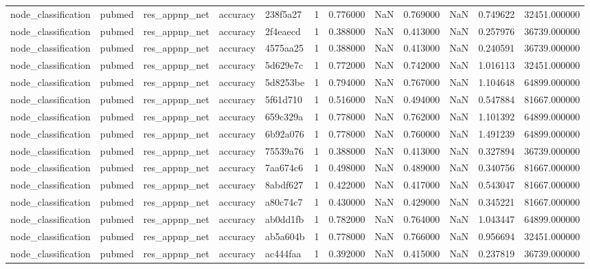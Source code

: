 \begin{tabular}{lllllrrrrrrr}
node_classification & pubmed & res_appnp_net & accuracy & 238f5a27 & 1 & 0.776000 & NaN & 0.769000 & NaN & 0.749622 & 32451.000000 \\
node_classification & pubmed & res_appnp_net & accuracy & 2f4eaecd & 1 & 0.388000 & NaN & 0.413000 & NaN & 0.257976 & 36739.000000 \\
node_classification & pubmed & res_appnp_net & accuracy & 4575aa25 & 1 & 0.388000 & NaN & 0.413000 & NaN & 0.240591 & 36739.000000 \\
node_classification & pubmed & res_appnp_net & accuracy & 5d629e7c & 1 & 0.772000 & NaN & 0.742000 & NaN & 1.016113 & 32451.000000 \\
node_classification & pubmed & res_appnp_net & accuracy & 5d8253be & 1 & 0.794000 & NaN & 0.767000 & NaN & 1.104648 & 64899.000000 \\
node_classification & pubmed & res_appnp_net & accuracy & 5f61d710 & 1 & 0.516000 & NaN & 0.494000 & NaN & 0.547884 & 81667.000000 \\
node_classification & pubmed & res_appnp_net & accuracy & 659c329a & 1 & 0.778000 & NaN & 0.762000 & NaN & 1.101392 & 64899.000000 \\
node_classification & pubmed & res_appnp_net & accuracy & 6b92a076 & 1 & 0.778000 & NaN & 0.760000 & NaN & 1.491239 & 64899.000000 \\
node_classification & pubmed & res_appnp_net & accuracy & 75539a76 & 1 & 0.388000 & NaN & 0.413000 & NaN & 0.327894 & 36739.000000 \\
node_classification & pubmed & res_appnp_net & accuracy & 7aa674c6 & 1 & 0.498000 & NaN & 0.489000 & NaN & 0.340756 & 81667.000000 \\
node_classification & pubmed & res_appnp_net & accuracy & 8abdf627 & 1 & 0.422000 & NaN & 0.417000 & NaN & 0.543047 & 81667.000000 \\
node_classification & pubmed & res_appnp_net & accuracy & a80c74c7 & 1 & 0.430000 & NaN & 0.429000 & NaN & 0.345221 & 81667.000000 \\
node_classification & pubmed & res_appnp_net & accuracy & ab0dd1fb & 1 & 0.782000 & NaN & 0.764000 & NaN & 1.043447 & 64899.000000 \\
node_classification & pubmed & res_appnp_net & accuracy & ab5a604b & 1 & 0.778000 & NaN & 0.766000 & NaN & 0.956694 & 32451.000000 \\
node_classification & pubmed & res_appnp_net & accuracy & ac444faa & 1 & 0.392000 & NaN & 0.415000 & NaN & 0.237819 & 36739.000000 \\

\end{tabular}
